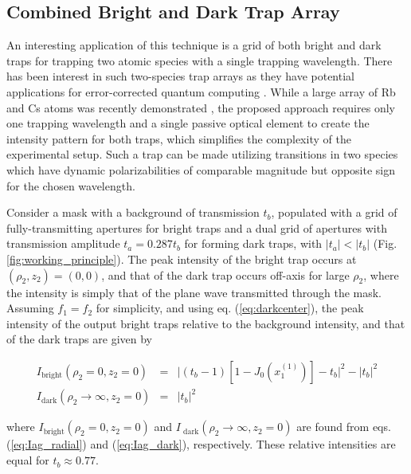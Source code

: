 \subsection{Combined Bright and Dark Trap Array}

An   interesting application of this technique is a grid of both bright and dark traps for trapping two atomic species with a single trapping wavelength. There has been interest in such two-species trap arrays as they have potential applications for error-corrected quantum computing \cite{Beterov2015}. While a large array of Rb and Cs atoms was recently demonstrated \cite{Singh2022}, the proposed approach requires only one trapping wavelength and a single passive optical element to create the intensity pattern for both traps, which simplifies the complexity  of the experimental setup. Such a trap can be made utilizing transitions in two species which have dynamic polarizabilities of comparable magnitude but opposite sign for the chosen wavelength.

Consider a mask with a background of transmission $t_b$, populated with a grid of fully-transmitting apertures for  bright traps and a dual grid of apertures with transmission amplitude $t_a = 0.287 t_b$ for forming dark traps, with $\left|t_a\right| < \left|t_b\right|$ (Fig. \ref{fig:working_principle}). The peak intensity of the bright trap occurs at $(\rho_2,z_2)=(0,0)$, and that of the dark trap occurs off-axis for large $\rho_2$, where the intensity is simply that of the plane wave transmitted through the mask. Assuming $f_1 = f_2$ for simplicity, and using eq. (\ref{eq:darkcenter}), the peak intensity of the output bright traps relative to the background intensity, and that of the dark traps are given by

\begin{eqnarray}
    I_{\text {bright}}(\rho_2=0,z_2=0) &=
    &\bigg|\left(t_{b}-1\right)\left[1-J_{0}\left(x_1^{(1)}\right)\right]  - t_{b}\bigg|^{2} -\left| t_{b} \right| ^{2}\\
    I_{\text{dark}}(\rho_2\rightarrow\infty,z_2=0) &=& \left|t_b \right|^2
\end{eqnarray}

where $I_{\text {bright}}(\rho_2=0,z_2=0)$ and $I_{\text{ dark}}(\rho_2\rightarrow\infty,z_2=0)$ are found from eqs. (\ref{eq:Iag_radial}) and (\ref{eq:Iag_dark}), respectively. These relative intensities are equal for $t_b\approx0.77$.

